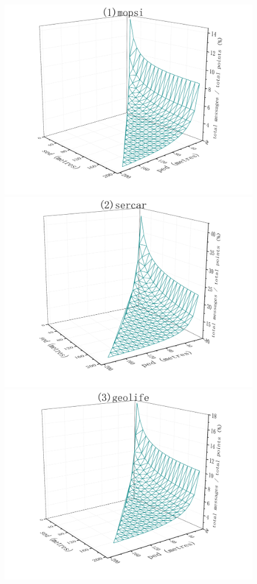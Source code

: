 {\begin{figure}[tb!]
	\centering
	\includegraphics[scale = 0.210]{figures/Fig-BITT-mopsi-total-messages.png}\hspace{1ex}
	\includegraphics[scale = 0.210]{figures/Fig-BITT-sercar-total-messages.png}\hspace{1ex}
	\includegraphics[scale = 0.210]{figures/Fig-BITT-geolife-total-messages.png}\hspace{1ex}

\end{figure}}
